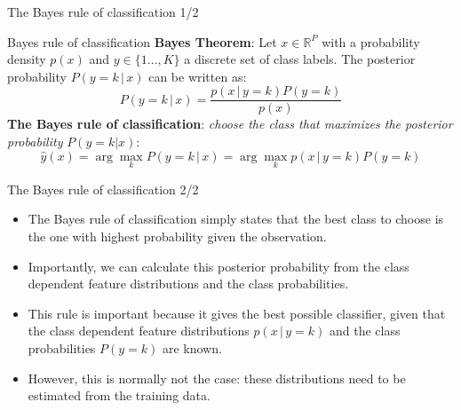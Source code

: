 \documentclass[xcolor=pdftex,dvipsnames,table]{beamer}
\begin{document}





\begin{frame}{The Bayes rule of classification 1/2}

\begin{block}{Bayes rule of classification}
	\textbf{Bayes Theorem}: Let $x \in \mathbb{R}^P$ with a probability density $p(x)$ and $y \in \{1 \ldots, K\}$ a discrete set of class labels. The posterior probability $P(y=k\,|\,x)$ can be written as:
	\begin{equation}
		P(y=k \, | \, x) = \frac{p(x \, | \, y=k) P(y=k)}{p(x)}
	\end{equation}
	\textbf{The Bayes rule of classification}: \emph{choose the class that maximizes the posterior probability} $P(y=k|x)$:
	\begin{equation}\label{equ:bayes_rule}
		\hat{y}(x) = \arg\max_k P(y=k \, | \, x) = \arg\max_k p(x\,|\,y=k)P(y=k)
	\end{equation}
\end{block}

\end{frame}


\begin{frame}{The Bayes rule of classification 2/2}
\begin{itemize}
\item The Bayes rule of classification simply states that the best class to choose is the one with highest probability given the observation.
\item Importantly, we can calculate this posterior probability from the class dependent feature distributions and the class probabilities.
\item This rule is important because it gives the best possible classifier, given that the class dependent feature distributions $p(x\,|\,y=k)$ and the class probabilities $P(y=k)$ are known.
\item However, this is normally not the case: these distributions need to be estimated from the training data.
\end{itemize}
\end{frame}
\end{document}
